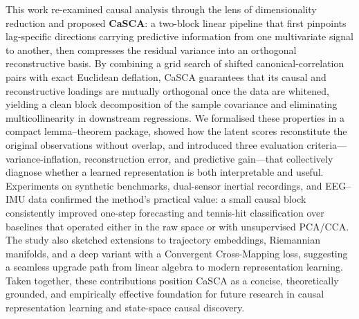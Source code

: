 \documentclass[14pt]{extarticle}
\begin{document}
	This work re-examined causal analysis through the lens of dimensionality reduction and proposed \textbf{CaSCA}: a two-block linear pipeline that first pinpoints lag-specific directions carrying predictive information from one multivariate signal to another, then compresses the residual variance into an orthogonal reconstructive basis.  
	By combining a grid search of shifted canonical-correlation pairs with exact Euclidean deflation, CaSCA guarantees that its causal and reconstructive loadings are mutually orthogonal once the data are whitened, yielding a clean block decomposition of the sample covariance and eliminating multicollinearity in downstream regressions.  
	We formalised these properties in a compact lemma–theorem package, showed how the latent scores reconstitute the original observations without overlap, and introduced three evaluation criteria—variance-inflation, reconstruction error, and predictive gain—that collectively diagnose whether a learned representation is both interpretable and useful.  
	Experiments on synthetic benchmarks, dual-sensor inertial recordings, and EEG–IMU data confirmed the method’s practical value: a small causal block consistently improved one-step forecasting and tennis-hit classification over baselines that operated either in the raw space or with unsupervised PCA/CCA.  
	The study also sketched extensions to trajectory embeddings, Riemannian manifolds, and a deep variant with a Convergent Cross-Mapping loss, suggesting a seamless upgrade path from linear algebra to modern representation learning.  
	Taken together, these contributions position CaSCA as a concise, theoretically grounded, and empirically effective foundation for future research in causal representation learning and state-space causal discovery.
	
	
	
	
	
\end{document}
